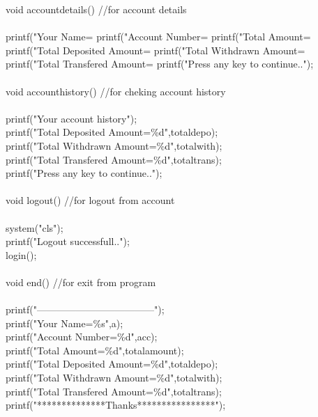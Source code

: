 \documentclass[12pt,a4 paper]{article}
\begin{document}
void accountdetails()            //for account details\\
{\\
	printf("Your Name=%
    printf("Account Number=%
    printf("Total Amount=%
    printf("Total Deposited Amount=%
    printf("Total Withdrawn Amount=%
    printf("Total Transfered Amount=%
    printf("Press any key to continue..");\\
}\\
void accounthistory()            //for cheking account history\\
{\\
	printf("Your account history");\\
    printf("Total Deposited Amount=\%d",totaldepo);\\ 
    printf("Total Withdrawn Amount=\%d",totalwith); \\
    printf("Total Transfered Amount=\%d",totaltrans);\\ 
    printf("Press any key to continue..");	\\
}\\
void logout()                    //for logout from account\\ 
 {\\
	system("cls");\\
	printf("Logout successfull..");\\
	login();\\
}\\
void end()                        //for exit from program\\
{\\
    printf("------------------------------------");\\
    printf("Your Name=\%s",a);\\
    printf("Account Number=\%d",acc);\\
    printf("Total Amount=\%d",totalamount);\\ 
    printf("Total Deposited Amount=\%d",totaldepo);\\
    printf("Total Withdrawn Amount=\%d",totalwith); \\
    printf("Total Transfered Amount=\%d",totaltrans); \\
    printf("**************Thanks****************"); \\
}
\newpage
\end{document}
